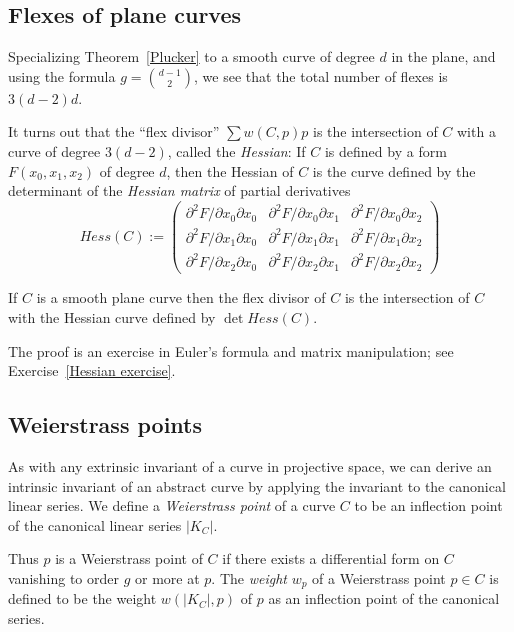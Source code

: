 \subsection{Flexes of plane curves}\label{plane curve pluecker}

Specializing Theorem~\ref{Plucker} to a smooth curve of degree $d$ in the plane, and using the formula
$g= {d-1\choose 2}$, we see that the total number of flexes is $3(d-2)d$. 

It turns out that the ``flex divisor''
$\sum w(C, p)p$
is the intersection of $C$ with a curve of degree $3(d-2)$, called the \emph{Hessian}: If $C$ is defined by a form $F(x_0, x_1, x_2)$ of degree $d$, then
the Hessian of $C$ is the curve defined by the determinant of the \emph{Hessian matrix} of partial derivatives
$$
Hess(C) :=
\begin{pmatrix}
 \partial^2 F/\partial x_0 \partial x_0 & \partial^2 F/\partial x_0 \partial x_1 & \partial^2 F/\partial x_0 \partial x_2 \\
\partial^2 F/\partial x_1 \partial x_0 & \partial^2 F/\partial x_1 \partial x_1 & \partial^2 F/\partial x_1 \partial x_2 \\
\partial^2 F/\partial x_2 \partial x_0 & \partial^2 F/\partial x_2 \partial x_1 & \partial^2 F/\partial x_2 \partial x_2 
\end{pmatrix}
$$
\begin{theorem}\label{Hessian} If $C$ is a smooth plane curve then the flex divisor of $C$ is the intersection 
of $C$ with the Hessian curve defined by $\det Hess(C)$.
\end{theorem}
The proof is an exercise in Euler's formula and matrix manipulation; see Exercise~\ref{Hessian exercise}.

\subsection{Weierstrass points}\label{Weierstrass points}

As with any extrinsic invariant of a curve in projective space, we can derive an intrinsic invariant of an abstract curve by applying the invariant to the canonical linear series. We define a \emph{Weierstrass point} of a curve $C$ to be an inflection point of the canonical linear series $|K_C|$. 

Thus $p$ is a Weierstrass point of $C$ if there exists a  differential form on $C$ vanishing to order $g$ or more at $p$. The \emph{weight} $w_p$ of a Weierstrass point $p \in C$  is defined to be the weight $w(|K_C|,p)$ of $p$ as an inflection point of the canonical series. 

